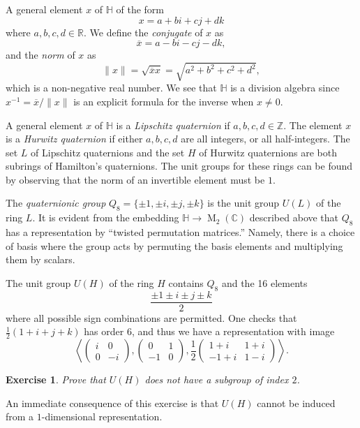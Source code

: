 \documentclass[12pt]{article}
\theoremstyle{plain}
\newtheorem{exercise}[theorem]{Exercise}
\theoremstyle{definition}
\theoremstyle{remark}
\numberwithin{equation}{section}
\begin{document}
A general element $x$ of $\mathbb{H}$ of the form
\[
x = a + bi + cj + dk
\]
where $a,b,c,d \in \mathbb{R}$.
We define the \emph{conjugate} of $x$ as
\[
\overline{x} = a -bi-cj-dk,
\]
and the \emph{norm} of $x$ as
\[
\|x\| = \sqrt{\overline{x} x} = \sqrt{a^2+b^2+c^2+d^2},
\]
which is a non-negative real number.
We see that $\mathbb{H}$ is a division algebra
since $x^{-1} = \overline{x}/\|x\|$ is an explicit formula for the
inverse when $x \ne 0$.

A general element $x$ of $\mathbb{H}$
is a \emph{Lipschitz quaternion} if
$a,b,c,d \in \mathbb{Z}$.
The element $x$ is a \emph{Hurwitz quaternion}
if either $a,b,c,d$ are all integers, or all half-integers.
The set $L$ of Lipschitz quaternions and the set $H$ of Hurwitz
quaternions are both subrings of Hamilton's quaternions.
The unit groups for these rings can be found by observing that the norm of
an invertible element must be $1$.

The \emph{quaternionic group} $Q_8 = \{\pm 1, \pm i, \pm j, \pm k\}$ is
the unit group $U(L)$ of the ring $L$.
It is evident from the embedding
$\mathbb{H} \to \operatorname{M}_2(\mathbb{C})$ described above
that $Q_8$ has a representation by ``twisted permutation
matrices.''
Namely, there is a choice of basis where the group acts by permuting
the basis elements and multiplying them by scalars.

The unit group $U(H)$ of the ring $H$ contains $Q_8$ and the 16 elements
\[
\frac{ \pm 1 \pm i \pm j \pm k }{2}
\]
where all possible sign combinations are permitted.
One checks that $\frac{1}{2}(1+i+j+k)$ has order $6$, and thus we have a
representation with image
\[
\left\langle \begin{pmatrix} i&0\\0&-i \end{pmatrix},
\begin{pmatrix} 0&1\\-1&0 \end{pmatrix},
\frac{1}{2} \begin{pmatrix} 1+i&1+i\\-1+i&1-i \end{pmatrix}\right\rangle
.
\]

\begin{exercise}
Prove that $U(H)$ does not have a subgroup of index $2$.
\end{exercise}

An immediate consequence of this exercise is that $U(H)$ cannot be
induced from a $1$-dimensional representation.
\end{document}
